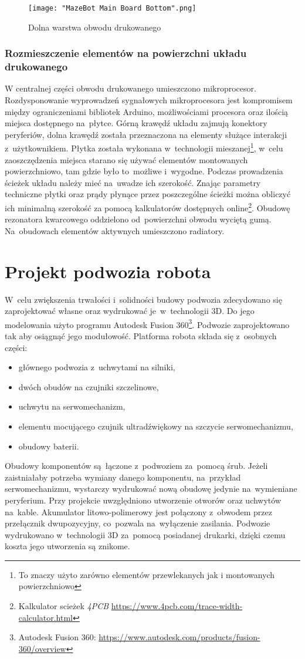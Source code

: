 \documentclass[11pt]{article}
\begin{document}
\begin{figure}[!htbp]
	\centering
	\texttt{[image: "MazeBot Main Board Bottom".png]}
	\caption{Dolna warstwa obwodu drukowanego}
	\label{fig:pcb_bottom}
\end{figure}

\subsubsection{Rozmieszczenie elementów na powierzchni układu drukowanego}
W centralnej części obwodu drukowanego umieszczono mikroprocesor.
Rozdysponowanie wyprowadzeń sygnałowych mikroprocesora jest kompromisem między ograniczeniami bibliotek Arduino, możliwościami procesora oraz ilością miejsca dostępnego na~płytce.
Górną krawędź układu zajmują konektory peryferiów, dolna krawędź została przeznaczona na elementy służące interakcji z~użytkownikiem.
Płytka została wykonana w~technologii mieszanej\footnote{To znaczy użyto zarówno elementów przewlekanych jak i montowanych powierzchniowo}, w~celu zaoszczędzenia miejsca starano się używać elementów montowanych powierzchniowo, tam gdzie było to~możliwe i~wygodne.
Podczas prowadzenia ścieżek układu należy mieć na~uwadze ich szerokość.
Znając parametry techniczne płytki oraz prądy płynące przez poszczególne ścieżki można obliczyć ich minimalną szerokość za pomocą kalkulatorów dostępnych online\footnote{Kalkulator scieżek \textit{4PCB} \url{https://www.4pcb.com/trace-width-calculator.html}}.
Obudowę rezonatora kwarcowego oddzielono od~powierzchni obwodu wyciętą gumą.
Na~obudowach elementów aktywnych umieszczono radiatory.

\section{Projekt podwozia robota}
W~celu zwiększenia trwałości i~solidności budowy podwozia zdecydowano się zaprojektować własne oraz wydrukować je~w~technologii 3D.
Do jego modelowania użyto programu Autodesk Fusion 360\footnote{Autodesk Fusion 360: \url{https://www.autodesk.com/products/fusion-360/overview}}.
Podwozie zaprojektowano tak aby osiągnąć jego modułowość.
Platforma robota składa się z~osobnych części:
\begin{itemize}
	\item głównego podwozia z~uchwytami na silniki,
	\item dwóch obudów na czujniki szczelinowe,
	\item uchwytu na serwomechanizm,
	\item elementu mocującego czujnik ultradźwiękowy na szczycie serwomechanizmu,
	\item obudowy baterii.
\end{itemize}
Obudowy komponentów są~łączone z~podwoziem za~pomocą śrub.
Jeżeli zaistniałaby potrzeba wymiany danego komponentu, na~przykład serwomechanizmu, wystarczy wydrukować nową obudowę jedynie na~wymieniane peryferium.
Przy projekcie uwzględniono utworzenie otworów oraz uchwytów na~kable.
Akumulator litowo-polimerowy jest połączony z~obwodem przez przełącznik dwupozycyjny, co~pozwala na~wyłączenie zasilania.
Podwozie wydrukowano w~technologii 3D za~pomocą posiadanej drukarki, dzięki czemu koszta jego utworzenia są znikome.
\end{document}
